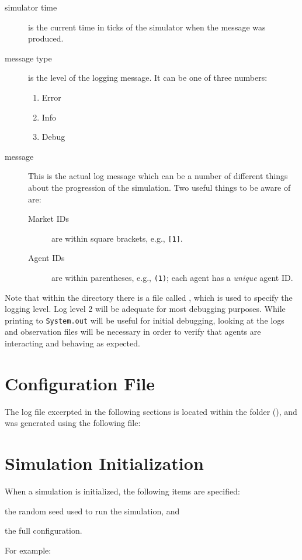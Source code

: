 \documentclass[11pt]{article}
\newcommand{\simspec}{../simulation_spec.json}
\begin{document}
\begin{description}
\item[simulator time] is the current time in ticks of the simulator when the
  message was produced.
\item[message type] is the level of the logging message. It can be one of three numbers:
  \begin{enumerate}[1)]
    \item Error
    \item Info
    \item Debug
  \end{enumerate}

\item[message] This is the actual log message which can be a number of
  different things about the progression of the simulation. Two useful things to
  be aware of are:
  \begin{description}
  \item[Market IDs] are within square brackets, e.g., \texttt{[1]}.
  \item[Agent IDs] are within parentheses, e.g., \texttt{(1)};
    each agent has a \emph{unique} agent ID.
  \end{description}
\end{description}

Note that within the  directory there is a file called
, which is used to specify the logging level. Log level 2 will be adequate for most debugging purposes.
%
While printing to \texttt{System.out} will be useful for initial debugging,
looking at the logs and observation files will be necessary in order to verify that agents are interacting and behaving as expected.

\section{Configuration File}

The log file excerpted in the following sections is located within the  folder 
(), and was generated using the
following  file:



\section{Simulation Initialization}

When a simulation is initialized, the following items are
specified: \begin{inparaenum}[1)] \item the
  random seed used to run the simulation, and \item the full configuration.
   \end{inparaenum} For
example:
\end{document}
